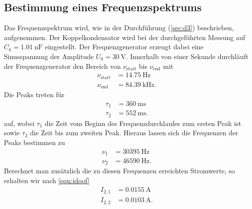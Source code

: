 \subsection{Bestimmung eines Frequenzspektrums}
Das Frequenzspektrum wird, wie in der Durchführung (\ref{sec:d3}) beschrieben, aufgenommen.
Der Koppelkondensator wird bei der durchgeführten Messung auf $C_k = \SI{1.01}{\nano\farad}$ eingestellt.
Der Frequenzgenerator erzeugt dabei eine Sinusspannung der Amplitude $U_0 = \SI{30}{\volt}$.
Innerhalb von einer Sekunde durchläuft der Frequenzgenerator den Bereich von $\nu_{\text{start}}$ bis $\nu_{\text{end}}$ mit
\begin{align*}
  \nu_{\text{start}} &= \SI{14.75}{\hertz} \\
  \nu_{\text{end}} &= \SI{84.39}{\kilo\hertz}.
\end{align*}
Die Peaks treten für
\begin{align*}
  \tau_1 &= \SI{360}{\milli\second} \\
  \tau_2 &= \SI{552}{\milli\second}.
\end{align*}
auf, wobei $\tau_1$ die Zeit vom Beginn des Frequenzdurchlaufes zum ersten Peak ist sowie $\tau_2$ die Zeit bis zum zweiten Peak.
Hieraus lassen sich die Frequenzen der Peaks bestimmen zu
\begin{align*}
  \nu_1 &= \SI{30395}{\hertz} \\
  \nu_2 &= \SI{46590}{\hertz}.
\end{align*}
Berechnet man zusätzlich die zu diesen Frequenzen erreichten Stromwerte, so erhalten wir nach \eqref{eqn:idoof}
\begin{align*}
  I_{2,1} &= \SI{0.0155}{\ampere} \\
  I_{2,2} &= \SI{0.0103}{\ampere}.
\end{align*}
%
%
%
%
%
%    
%
%
